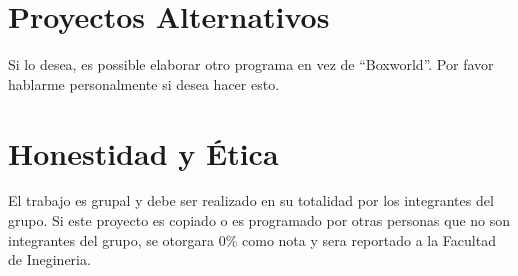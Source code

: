 \documentclass{article}
\begin{document}
\section*{Proyectos Alternativos}
Si lo desea, es possible elaborar otro programa en vez de ``Boxworld''. Por favor
hablarme personalmente si desea hacer esto.

\section*{Honestidad y \'Etica}
El trabajo es grupal y debe ser realizado en su totalidad por los integrantes del
grupo. Si este proyecto es copiado o es programado por otras personas que no son
integrantes del grupo, se otorgara 0\% como nota y sera reportado a la Facultad
de Inegineria.
\end{document}
